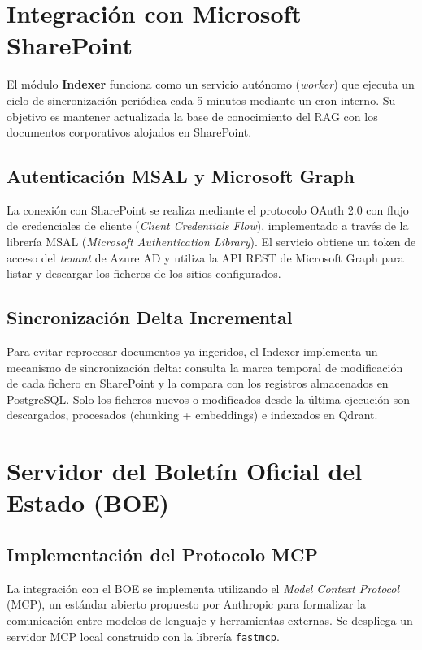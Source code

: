 \section{Integración con Microsoft SharePoint}

El módulo \textbf{Indexer} funciona como un servicio autónomo (\textit{worker}) que ejecuta un ciclo de sincronización periódica cada 5 minutos mediante un cron interno. Su objetivo es mantener actualizada la base de conocimiento del RAG con los documentos corporativos alojados en SharePoint.

\subsection{Autenticación MSAL y Microsoft Graph}
La conexión con SharePoint se realiza mediante el protocolo OAuth 2.0 con flujo de credenciales de cliente (\textit{Client Credentials Flow}), implementado a través de la librería MSAL (\textit{Microsoft Authentication Library}). El servicio obtiene un token de acceso del \textit{tenant} de Azure AD y utiliza la API REST de Microsoft Graph para listar y descargar los ficheros de los sitios configurados.

\subsection{Sincronización Delta Incremental}
Para evitar reprocesar documentos ya ingeridos, el Indexer implementa un mecanismo de sincronización delta: consulta la marca temporal de modificación de cada fichero en SharePoint y la compara con los registros almacenados en PostgreSQL. Solo los ficheros nuevos o modificados desde la última ejecución son descargados, procesados (chunking + embeddings) e indexados en Qdrant.

\section{Servidor del Boletín Oficial del Estado (BOE)}

\subsection{Implementación del Protocolo MCP}
La integración con el BOE se implementa utilizando el \textit{Model Context Protocol} (MCP), un estándar abierto propuesto por Anthropic para formalizar la comunicación entre modelos de lenguaje y herramientas externas. Se despliega un servidor MCP local construido con la librería \texttt{fastmcp}.

